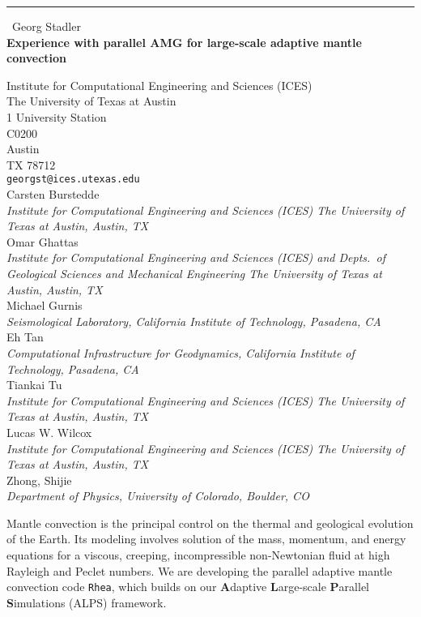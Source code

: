 \documentclass{report}
\begin{document}
\begin{center}
\rule{6in}{1pt} \
{\large Georg Stadler \\
{\bf Experience with parallel AMG for large-scale adaptive mantle convection}}

Institute for Computational Engineering and Sciences (ICES) \\ The University of Texas at Austin \\ 1 University Station \\ C0200 \\ Austin \\ TX 78712
\\
{\tt georgst@ices.utexas.edu}\\
Carsten Burstedde\\
{\em Institute for Computational Engineering and Sciences (ICES)
The University of Texas at Austin, Austin, TX}\\
Omar Ghattas\\
{\em Institute for Computational Engineering and Sciences (ICES) and Depts.\ of Geological Sciences and Mechanical Engineering
The University of Texas at Austin, Austin, TX}\\
Michael Gurnis\\
{\em Seismological Laboratory, California Institute of Technology, Pasadena, CA}\\
Eh Tan\\
{\em Computational Infrastructure for Geodynamics, California Institute of Technology, Pasadena, CA}\\
Tiankai Tu\\
{\em Institute for Computational Engineering and Sciences (ICES)
The University of Texas at Austin, Austin, TX}\\
Lucas W. Wilcox\\
{\em Institute for Computational Engineering and Sciences (ICES)
The University of Texas at Austin, Austin, TX}\\
	Zhong, Shijie\\
{\em Department of Physics, University of Colorado, Boulder, CO}\end{center}

Mantle convection is the principal control on the thermal and
geological evolution of the Earth. Its modeling involves solution of the
mass, momentum, and energy equations for a viscous, creeping,
incompressible non-Newtonian fluid at high Rayleigh and Peclet numbers.
We are developing the parallel adaptive mantle convection code
\texttt{Rhea}, which builds on our \textbf{A}daptive \textbf{L}arge-scale
\textbf{P}arallel \textbf{S}imulations (ALPS) framework.
\end{document}
